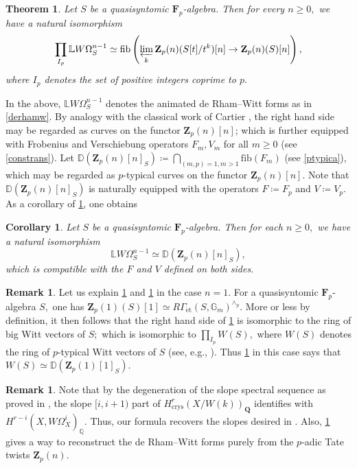\documentclass[10pt,letterpaper]{amsart}
\numberwithin{figure}{section}
\numberwithin{equation}{section}
\newtheorem{theorem}[figure]{Theorem}
\newtheorem{corollary}[figure]{Corollary}
\theoremstyle{definition}
\theoremstyle{definition}
\newtheorem{remark}[figure]{Remark}
\theoremstyle{definition}
\theoremstyle{definition}
\DeclareMathOperator{\crys}{crys}
\newcommand{\LL}{\L}
\renewcommand{\L}{\mathbb{L}}
\newcommand{\Z}{\mathbf{Z}}
\newcommand{\F}{\mathbf{F}}
\newcommand{\Q}{\mathbf{Q}}
\begin{document}
\begin{theorem}\label{mainthmintro}
    Let $S$ be a quasisyntomic $\F_p$-algebra. Then for every $n \ge 0,$ we have a natural isomorphism
$$\prod_{I_p}\L W\Omega^{n-1}_S \simeq \mathrm{fib} \left(\varprojlim_k \Z_p(n)(S[t]/t^k)[n] \to \Z_p(n)(S)[n]\right),$$ where $I_p$ denotes the set of positive integers coprime to $p.$
\end{theorem}{}

In the above, $\LL W\Omega^{n-1}_S$ denotes the animated de Rham--Witt forms as in \cref{derhamw}. By analogy with the classical work of Cartier \cite{Cart}, the right hand side may be regarded as curves on the functor $\Z_p (n)[n]$; which is further equipped with Frobenius and Verschiebung operators $F_m, V_m$ for all $m \ge 0$ (see \cref{constrans}). Let $\mathbb{D}(\Z_p(n)[n]_S)\coloneqq \bigcap_{(m,p)=1, m>1} \mathrm{fib}(F_m)$ (see \cref{ptypica}), which may be regarded as $p$-typical curves on the functor $\Z_p(n)[n].$ Note that $\mathbb{D}(\Z_p(n)[n]_S)$ is naturally equipped with the operators $F\coloneqq F_p$ and $V\coloneqq V_p$. As a corollary of \cref{mainthmintro}, one obtains

\begin{corollary}\label{coro}
    Let $S$ be a quasisyntomic $\F_p$-algebra. Then for each $n \ge 0,$ we have a natural isomorphism 
$$ \LL W \Omega_S^{n-1} \simeq \mathbb{D}(\Z_p(n)[n]_S),$$ which is compatible with the $F$ and $V$ defined on both sides.
\end{corollary}{}

\begin{remark}
Let us explain \cref{mainthmintro} and \cref{coro} in the case $n=1.$ For a quasisyntomic $\F_p$-algebra $S,$ one has $\Z_p(1) (S)[1]\simeq R\Gamma_{\mathrm{\acute{e}t}} (S, \mathbb G_m)^{\wedge_p}.$ More or less by definition, it then follows that the right hand side of \cref{mainthmintro} is isomorphic to the ring of big Witt vectors of $S;$ which is isomorphic to $\prod_{I_p}W(S),$ where $W(S)$ denotes the ring of $p$-typical Witt vectors of $S$ (see, e.g., \cite[Prop.~3.6]{bloch}). Thus \cref{coro} in this case says that $W(S) \simeq \mathbb{D}(\mathbf{Z}_p(1)[1]_S).$
\end{remark}{}


\begin{remark}\label{artinmazurquestionrem}
    Note that by the degeneration of the slope spectral sequence as proved in \cite{Luc1}, the slope $[i, i+1)$ part of $H^r_{\crys}(X/W(k))_{\Q}$ identifies with $H^{r-i}(X, W\Omega^i_X )_\mathbb{Q}$. Thus, our formula recovers the slopes desired in \cite[Qn.~(b)]{AM}. Also, \cref{coro} gives a way to reconstruct the de Rham--Witt forms purely from the $p$-adic Tate twists $\Z_p(n).$
\end{remark}{}
\end{document}

